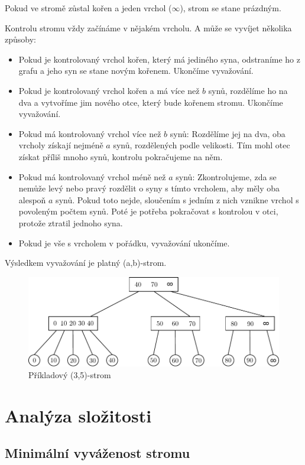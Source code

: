 \documentclass[a4paper,11pt,openany]{article}
\begin{document}
Pokud ve stromě zůstal kořen a jeden vrchol ($\infty$), strom se stane prázdným.

Kontrolu stromu vždy začínáme v nějakém vrcholu. A může se vyvíjet několika způsoby:

\begin{itemize}
	\item
	Pokud je kontrolovaný vrchol kořen, který má jediného syna, odstraníme ho z grafu a jeho syn se stane novým kořenem. Ukončíme vyvažování.
	\item
	Pokud je kontrolovaný vrchol kořen a má více než $b$ synů, rozdělíme ho na dva a vytvoříme jim nového otce, který bude kořenem stromu. Ukončíme vyvažování.
	\item
	Pokud má kontrolovaný vrchol více než $b$ synů: Rozdělíme jej na dva, oba vrcholy získají nejméně $a$ synů, rozdělených podle velikosti. Tím mohl otec získat příliš mnoho synů, kontrolu pokračujeme na něm.
	\item
	Pokud má kontrolovaný vrchol méně než $a$ synů: Zkontrolujeme, zda se nemůže levý nebo pravý rozdělit o syny s tímto vrcholem, aby měly oba alespoň $a$ synů. Pokud toto nejde, sloučením s jedním z nich vznikne vrchol s povoleným počtem synů. Poté je potřeba pokračovat s kontrolou v otci, protože ztratil jednoho syna.
	\item
	Pokud je vše s vrcholem v pořádku, vyvažování ukončíme.
\end{itemize}

Výsledkem vyvažování je platný (a,b)-strom.

\begin{figure}
	\centering
	\includegraphics{pics/drawing.pdf}
	\caption{Příkladový (3,5)-strom}
\end{figure}

\section{Analýza složitosti}

\subsection{Minimální vyváženost stromu}
\end{document}
